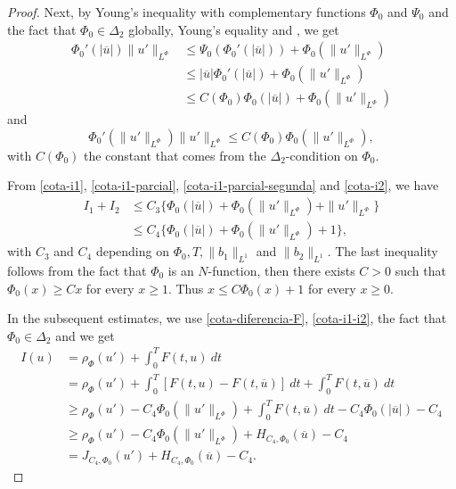 \documentclass[twoside]{article}
\theoremstyle{remark}
\newcommand{\orlnor}{\|_{L^{\Phi}}}
\renewcommand{\leq}{\leqslant}
\renewcommand{\geq}{\geqslant}
\begin{document}
\begin{proof}
Next, by Young's inequality with complementary functions $\Phi_0$ and $\Psi_0$ and the fact that 
$\Phi_0 \in \Delta_2$ globally, Young's equality \cite[Eq. 2.7-2.8]{KR} and \cite[Thm. 3-(ii), p. 23]{rao1991theory}, we get
\begin{equation}\label{cota-i1-parcial}
 \begin{split}
\Phi_0'(|\overline{u}|) \|u'\orlnor
&\leq 
\Psi_0(\Phi_0'(|\overline{u}|))+
\Phi_0(\|u'\orlnor)
\\
&\leq 
|\overline{u}|\Phi_0'(|\overline{u}|)
+\Phi_0(\|u'\orlnor)
\\
&\leq C(\Phi_0)
\Phi_0(|\overline{u}|)
+\Phi_0(\|u'\orlnor)
\end{split}
\end{equation}
and 
\begin{equation}\label{cota-i1-parcial-segunda}
\Phi_0'(\|u'\orlnor) \|u'\orlnor
\leq 
C(\Phi_0) \Phi_0(\|u'\orlnor),
\end{equation}
with $C(\Phi_0)$ the constant that comes from the $\Delta_2$-condition on $\Phi_0$.

From \eqref{cota-i1}, \eqref{cota-i1-parcial}, \eqref{cota-i1-parcial-segunda} and \eqref{cota-i2},
we have
\begin{equation}\label{cota-i1-i2}
\begin{split}
I_1+I_2
&
\leq C_3
\bigg\{ 
\Phi_0(|\overline{u}|)
+\Phi_0(\|u'\orlnor)
+\|u'\orlnor
\bigg\}\\
&
\leq C_4
\bigg\{ 
\Phi_0(|\overline{u}|)
+\Phi_0(\|u'\orlnor)
+1
\bigg\},
\end{split}
\end{equation}
with $C_3$ and $C_4$ depending on $\Phi_0, T, \|b_1\|_{L^1}$ and $\|b_2\|_{L^1} $. The last inequality follows from the fact that $\Phi_0$ is an $N$-function, then there exists $C>0$ such that $\Phi_0(x)\geq Cx$ for every $x\geq 1$. Thus $x\leq C\Phi_0(x)+1$ for every $x\geq 0$.


In the subsequent estimates, we use  \eqref{cota-diferencia-F},
\eqref{cota-i1-i2}, the fact that $\Phi_0 \in \Delta_2$ and we get
\begin{equation}\label{cota_inf_I}
\begin{split}
I(u)&
=\rho_{\Phi}(u')+\int_0^TF(t,u)\ dt
\\ 
&=\rho_{\Phi}( u')+ \int_0^T \left[F(t,u)-F(t,\overline{u})\right]\ dt
+  \int_0^TF(t,\overline{u})\ dt
\\
&\geq \rho_{\Phi}( u')
-C_4 \Phi_0(\|u'\orlnor)
+\int_0^TF(t,\overline{u})\ dt-
C_4 \Phi_0(|\overline{u}|)-
C_4 
\\
&\geq 
\rho_{\Phi}( u')
-C_4 \Phi_0(\|u'\orlnor)
+H_{C_4, \Phi_0}(\overline{u})
-C_4 
\\
&=
J_{C_4,\Phi_0}(u')
+H_{C_4, \Phi_0}(\overline{u})
-C_4.
\end{split}
\end{equation}




\end{proof}
\end{document}
